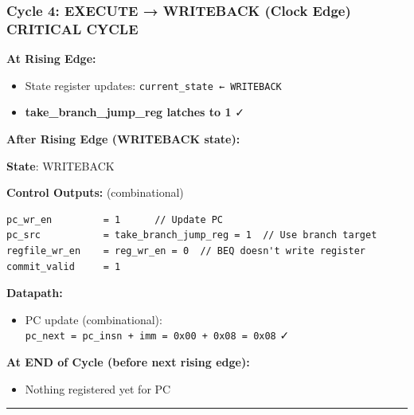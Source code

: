 \subsubsection{\texorpdfstring{Cycle 4: EXECUTE → WRITEBACK (Clock Edge)
\warn{} CRITICAL
CYCLE}{Cycle 4: EXECUTE → WRITEBACK (Clock Edge)  CRITICAL CYCLE}}\label{cr:fix:timing-analysis:cycle-4-execute-writeback-clock-edge-warning-critical-cycle}

\begin{record}

\textbf{At Rising Edge:}

\begin{itemize}
\tightlist
\item
  State register updates:
  \texttt{current\_\allowbreak{}state\ ←\ WRITEBACK}
\item
  \textbf{take\_\allowbreak{}branch\_\allowbreak{}jump\_\allowbreak{}reg
  latches to 1} ✓
\end{itemize}

\textbf{After Rising Edge (WRITEBACK state):}

\textbf{State}: WRITEBACK

\textbf{Control Outputs:} (combinational)

\begin{lstlisting}[language={}]
pc_wr_en         = 1      // Update PC
pc_src           = take_branch_jump_reg = 1  // Use branch target
regfile_wr_en    = reg_wr_en = 0  // BEQ doesn't write register
commit_valid     = 1
\end{lstlisting}

\textbf{Datapath:}

\begin{itemize}
\tightlist
\item
  PC update (combinational):
  \texttt{pc\_\allowbreak{}next\ =\allowbreak{}\ pc\_\allowbreak{}insn\ +\allowbreak{}\ imm\ =\allowbreak{}\ 0x00\ +\allowbreak{}\ 0x08\ =\allowbreak{}\ 0x08}
  ✓
\end{itemize}

\textbf{At END of Cycle (before next rising edge):}

\begin{itemize}
\tightlist
\item
  Nothing registered yet for PC
\end{itemize}

\begin{center}\rule{0.5\linewidth}{0.5pt}\end{center}

\end{record}

